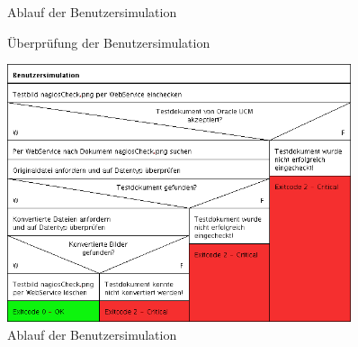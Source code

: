 \begin{figure}[ht]
	\centering
		\caption{Ablauf der Benutzersimulation}
		\label{usersim}
\end{figure}

\begin{figure}[ht]
	\centering
		\caption{Überprüfung der Benutzersimulation}
		\label{usersim2}
\end{figure}
%
\begin{figure}[ht]
	\centering
	   \includegraphics[width=0.9\textwidth]{bilder/Benutzersimulation.png}
		\caption{Ablauf der Benutzersimulation}
		\label{user-sim}
\end{figure}



